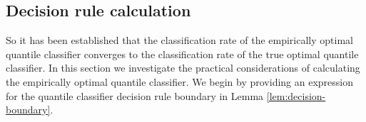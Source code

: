 



\subsection{Decision rule calculation}
\label{sec:empirical-quantile-classifier-results}

So it has been established that the classification rate of the empirically
optimal quantile classifier converges to the classification rate of the true
optimal quantile classifier.  In this section we investigate the practical
considerations of calculating the empirically optimal quantile classifier.  We
begin by providing an expression for the quantile classifier decision rule
boundary in Lemma \ref{lem:decision-boundary}.

